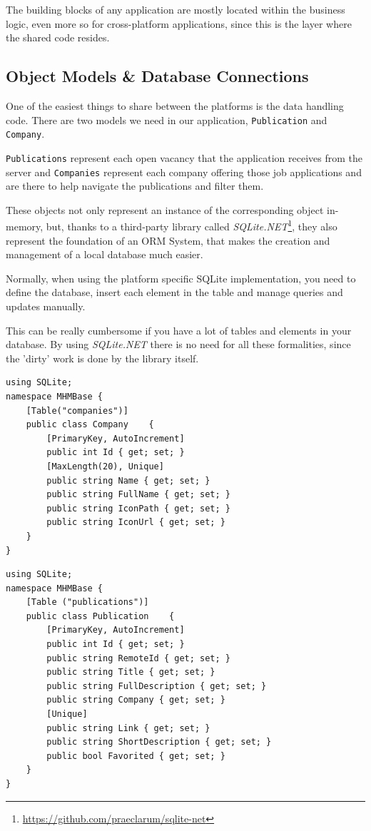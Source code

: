 The building blocks of any application are mostly located within the business logic, even more so for cross-platform applications, since this is the layer where the shared code resides.

\subsection{Object Models \& Database Connections}
One of the easiest things to share between the platforms is the data handling code. There are two models we need in our application, \texttt{Publication} and \texttt{Company}.  

\texttt{Publications} represent each open vacancy that the application receives from the server and \texttt{Companies} represent each company offering those job applications and are there to help navigate the publications and filter them.

These objects not only represent an instance of the corresponding object in-memory, but, thanks to a third-party library called \textit{SQLite.NET}\footnote{\url{https://github.com/praeclarum/sqlite-net}}, they also represent the foundation of an \ac{ORM} System, that makes the creation and management of a local database much easier.

Normally, when using the platform specific SQLite implementation, you need to define the database, insert each element in the table and manage queries and updates manually. 

This can be really cumbersome if you have a lot of tables and elements in your database. By using \textit{SQLite.NET} there is no need for all these formalities, since the 'dirty' work is done by the library itself.

\lstset{language=[Sharp]C}
\begin{lstlisting}[frame=lt,caption=Company.cs, label={list:comp}]
using SQLite;
namespace MHMBase {
	[Table("companies")]
	public class Company 	{
		[PrimaryKey, AutoIncrement]
		public int Id { get; set; }
		[MaxLength(20), Unique]
		public string Name { get; set; }
		public string FullName { get; set; }
		public string IconPath { get; set; }
		public string IconUrl { get; set; }
	}
}
\end{lstlisting}

\begin{lstlisting}[frame=lt,caption=Publication.cs, label={list:pub}]
using SQLite;
namespace MHMBase {
	[Table ("publications")]
	public class Publication	{
		[PrimaryKey, AutoIncrement]
		public int Id { get; set; }
		public string RemoteId { get; set; }
		public string Title { get; set; }
		public string FullDescription { get; set; }
		public string Company { get; set; }
		[Unique]
		public string Link { get; set; }
		public string ShortDescription { get; set; }
		public bool Favorited { get; set; }
	}
}
\end{lstlisting}

